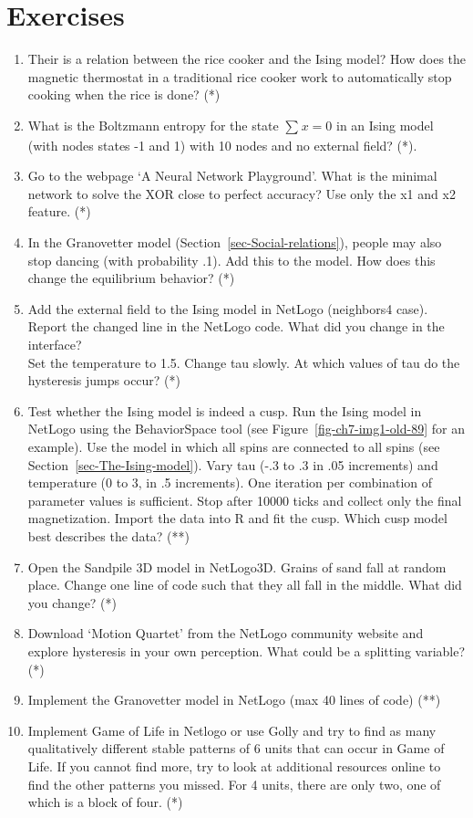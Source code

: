 \documentclass[
  a4paper,
  DIV=11,
  numbers=noendperiod]{scrreprt}
\begin{document}
\hypertarget{sec-Exercises}{%
\section{Exercises}\label{sec-Exercises}}

\begin{enumerate}
\def\labelenumi{\arabic{enumi})}
\item
  Their is a relation between the rice cooker and the Ising model? How
  does the magnetic thermostat in a traditional rice cooker work to
  automatically stop cooking when the rice is done? (*)
\item
  What is the Boltzmann entropy for the state \(\sum_{}^{}x = 0\) in an
  Ising model (with nodes states -1 and 1) with 10 nodes and no external
  field? (*).
\item
  Go to the webpage `A Neural Network Playground'. What is the minimal
  network to solve the XOR close to perfect accuracy? Use only the x1
  and x2 feature. (*)
\item
  In the Granovetter model (Section~\ref{sec-Social-relations}), people
  may also stop dancing (with probability .1). Add this to the model.
  How does this change the equilibrium behavior? (*)
\item
  Add the external field to the Ising model in NetLogo (neighbors4
  case). Report the changed line in the NetLogo code. What did you
  change in the interface?\\
  Set the temperature to 1.5. Change tau slowly. At which values of tau
  do the hysteresis jumps occur? (*)
\item
  Test whether the Ising model is indeed a cusp. Run the Ising model in
  NetLogo using the BehaviorSpace tool (see
  Figure~\ref{fig-ch7-img1-old-89} for an example). Use the model in
  which all spins are connected to all spins (see
  Section~\ref{sec-The-Ising-model}). Vary tau (-.3 to .3 in .05
  increments) and temperature (0 to 3, in .5 increments). One iteration
  per combination of parameter values is sufficient. Stop after 10000
  ticks and collect only the final magnetization. Import the data into R
  and fit the cusp. Which cusp model best describes the data? (**)
\item
  Open the Sandpile 3D model in NetLogo3D. Grains of sand fall at random
  place. Change one line of code such that they all fall in the middle.
  What did you change? (*)
\item
  Download `Motion Quartet' from the NetLogo community website and
  explore hysteresis in your own perception. What could be a splitting
  variable? (*)
\item
  Implement the Granovetter model in NetLogo (max 40 lines of code) (**)
\item
  Implement Game of Life in Netlogo or use Golly and try to find as many
  qualitatively different stable patterns of 6 units that can occur in
  Game of Life. If you cannot find more, try to look at additional
  resources online to find the other patterns you missed. For 4 units,
  there are only two, one of which is a block of four. (*)
\end{enumerate}
\end{document}
